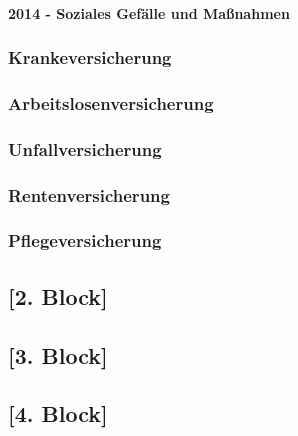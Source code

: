 \paragraph{2014 - Soziales Gefälle und Maßnahmen}

\subsubsection{Krankeversicherung}
\subsubsection{Arbeitslosenversicherung}
\subsubsection{Unfallversicherung}
\subsubsection{Rentenversicherung}
\subsubsection{Pflegeversicherung}

\subsection{[2. Block]}
\subsection{[3. Block]}
\subsection{[4. Block]}